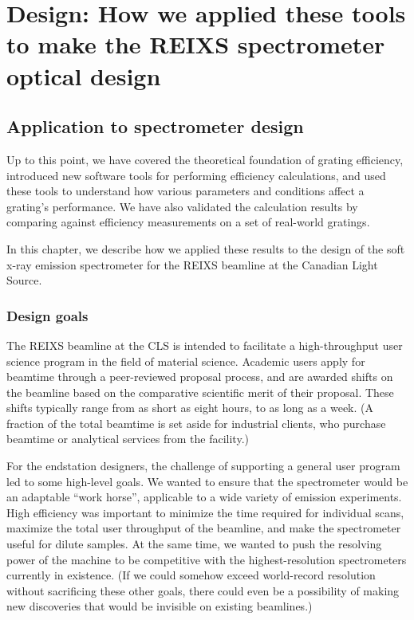 \chapter{Design: How we applied these tools to make the REIXS spectrometer optical design}
\section{Application to spectrometer design}
Up to this point, we have covered the theoretical foundation of grating efficiency, introduced new software tools for performing efficiency calculations, and used these tools to understand how various parameters and conditions affect a grating's performance.  We have also validated the calculation results by comparing against efficiency measurements on a set of  real-world gratings.

In this chapter, we describe how we applied these results to the design of the soft x-ray emission spectrometer for the REIXS beamline at the Canadian Light Source.

\subsection{Design goals}
The REIXS beamline at the CLS is intended to facilitate a high-throughput user science program in the field of material science.  Academic users apply for beamtime through a peer-reviewed proposal process, and are awarded shifts on the beamline based on the comparative scientific merit of their proposal.  These shifts typically range from as short as eight hours, to as long as a week.  (A fraction of the total beamtime is set aside for industrial clients, who purchase beamtime or analytical services from the facility.)

For the endstation designers, the challenge of supporting a general user program led to some high-level goals.  We wanted to ensure that the spectrometer would be an adaptable ``work horse'', applicable to a wide variety of emission experiments.  High efficiency was important to minimize the time required for individual scans, maximize the total user throughput of the beamline, and make the spectrometer useful for dilute samples.  At the same time, we wanted to push the resolving power of the machine to be competitive with the highest-resolution spectrometers currently in existence.  (If we could somehow exceed world-record resolution without sacrificing these other goals, there could even be a possibility of making new discoveries that would be invisible on existing beamlines.)

